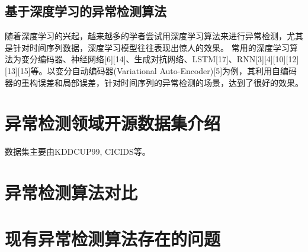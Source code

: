 \subsection{基于深度学习的异常检测算法}
随着深度学习的兴起，越来越多的学者尝试用深度学习算法来进行异常检测，尤其是针对时间序列数据，深度学习模型往往表现出惊人的效果。
常用的深度学习算法为变分编码器、神经网络[6][14]、生成对抗网络、LSTM[17]、RNN[3][4][10][12][13][15]等。以变分自动编码器(Variational Auto-Encoder)[5]为例，其利用自编码器的重构误差和局部误差，针对时间序列的异常检测的场景，达到了很好的效果。

\section{异常检测领域开源数据集介绍}
数据集主要由KDDCUP99, CICIDS等。
\section{异常检测算法对比}

\section{现有异常检测算法存在的问题}